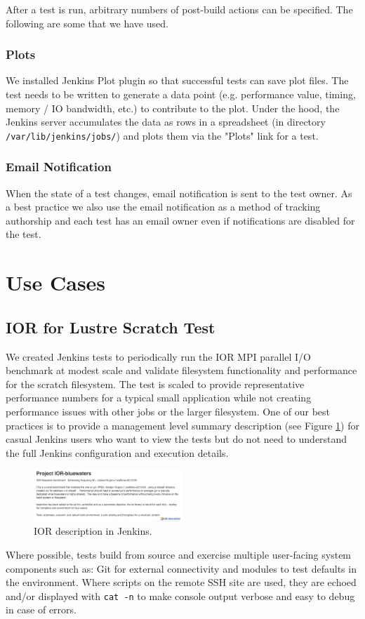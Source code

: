 \documentclass[AMA]{WileyNJD-v1}
\begin{document}
After a test is run, arbitrary numbers of post-build actions can be specified. 
The following are some that we have used. 

\subsubsection{Plots}
We installed Jenkins Plot plugin \cite{JenkinsPlotPlugin} so that successful tests can save plot files. 
The test needs to be written to generate a data point (e.g. performance value, timing, memory / IO bandwidth, etc.) to contribute to the plot. 
Under the hood, the Jenkins server accumulates the data as rows in a spreadsheet (in directory \texttt{/var/lib/jenkins/jobs/}) and plots them via the "Plots" link for a test.

\subsubsection{Email Notification}
When the state of a test changes, email notification is sent to the test owner. 
As a best practice we also use the email notification as a method of tracking authorship and each test has an email owner even if notifications are disabled for the test.

\section{Use Cases}
\label{sec:UseCases}
\subsection{IOR for Lustre Scratch Test}
We created Jenkins tests to periodically run the IOR MPI parallel I/O benchmark at modest scale and validate filesystem functionality and performance for the scratch filesystem. 
The test is scaled to provide representative performance numbers for a typical small application while not creating performance issues with other jobs or the larger filesystem.
One of our best practices is to provide a management level summary description (see Figure \ref{fig:IOR-bluewaters-descr}) for casual Jenkins users who want to view the tests but do not need to understand the full Jenkins configuration and execution details. 
 
\begin{figure}[H]
\centering
\includegraphics[width=0.5\textwidth]{IOR-bluewaters-descr}
\caption{IOR description in Jenkins.}
\label{fig:IOR-bluewaters-descr}
\end{figure}
Where possible, tests build from source and exercise multiple user-facing system components such as: Git for external connectivity and modules to test defaults in the environment. 
Where scripts on the remote SSH site are used, they are echoed and/or displayed with \texttt{cat -n} to make console output verbose and easy to debug in case of errors. 
 
\end{document}
